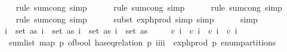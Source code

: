 \begin{isabellebody}
\ \ \ \ \isamarkupfalse%
\ {\isacharparenleft}{\kern0pt}rule\ sum{\isachardot}{\kern0pt}cong{\isacharcomma}{\kern0pt}\ simp{\isacharparenright}{\kern0pt}\isanewline
\ \ \ \ \isamarkupfalse%
\ {\isacharparenleft}{\kern0pt}rule\ sum{\isachardot}{\kern0pt}cong{\isacharcomma}{\kern0pt}\ simp{\isacharparenright}{\kern0pt}\isanewline
\ \ \ \ \isamarkupfalse%
\ {\isacharparenleft}{\kern0pt}rule\ sum{\isachardot}{\kern0pt}cong{\isacharcomma}{\kern0pt}\ simp{\isacharparenright}{\kern0pt}\isanewline
\ \ \ \ \isamarkupfalse%
\ {\isacharparenleft}{\kern0pt}rule\ sum{\isachardot}{\kern0pt}cong{\isacharcomma}{\kern0pt}\ simp{\isacharparenright}{\kern0pt}\isanewline
\ \ \ \ \isamarkupfalse%
\ {\isacharparenleft}{\kern0pt}subst\ exp{\isacharunderscore}{\kern0pt}h{\isacharunderscore}{\kern0pt}prod{\isacharcomma}{\kern0pt}\ simp{\isacharcomma}{\kern0pt}\ simp{\isacharparenright}{\kern0pt}\isanewline
\ \ \ \ \isamarkupfalse%
\ simp\isanewline
\ \ \isamarkupfalse%
\ \isamarkupfalse%
\ {\isachardoublequoteopen}{\isachardot}{\kern0pt}{\isachardot}{\kern0pt}{\isachardot}{\kern0pt}\ {\isacharequal}{\kern0pt}\ {\isacharparenleft}{\kern0pt}{\isasymSum}i{}\ {\isasymin}\ set\ as{\isachardot}{\kern0pt}\ {\isacharparenleft}{\kern0pt}{\isasymSum}i{}\ {\isasymin}\ set\ as{\isachardot}{\kern0pt}\ {\isacharparenleft}{\kern0pt}{\isasymSum}i{}\ {\isasymin}\ set\ as{\isachardot}{\kern0pt}\ {\isacharparenleft}{\kern0pt}{\isasymSum}i{}\ {\isasymin}\ set\ as{\isachardot}{\kern0pt}\ \isanewline
\ \ \ \ c\ i{}\ {\isacharasterisk}{\kern0pt}\ c\ i{}\ {\isacharasterisk}{\kern0pt}\ c\ i{}\ {\isacharasterisk}{\kern0pt}\ c\ i{}\ {\isacharasterisk}{\kern0pt}\ \isanewline
\ \ \ \ {\isacharparenleft}{\kern0pt}sum{\isacharunderscore}{\kern0pt}list\ {\isacharparenleft}{\kern0pt}map\ {\isacharparenleft}{\kern0pt}{\isasymlambda}p{\isachardot}{\kern0pt}\ of{\isacharunderscore}{\kern0pt}bool\ {\isacharparenleft}{\kern0pt}has{\isacharunderscore}{\kern0pt}eq{\isacharunderscore}{\kern0pt}relation\ p\ {\isacharbrackleft}{\kern0pt}i{}{\isacharcomma}{\kern0pt}i{}{\isacharcomma}{\kern0pt}i{}{\isacharcomma}{\kern0pt}i{}{\isacharbrackright}{\kern0pt}{\isacharparenright}{\kern0pt}\ {\isacharasterisk}{\kern0pt}\ exp{\isacharunderscore}{\kern0pt}h{\isacharunderscore}{\kern0pt}prod\ p{\isacharparenright}{\kern0pt}\ {\isacharparenleft}{\kern0pt}enum{\isacharunderscore}{\kern0pt}partitions\ {}{\isacharparenright}{\kern0pt}{\isacharparenright}{\kern0pt}{\isacharparenright}{\kern0pt}{\isacharparenright}{\kern0pt}{\isacharparenright}{\kern0pt}{\isacharparenright}{\kern0pt}{\isacharparenright}{\kern0pt}{\isachardoublequoteclose}\isanewline

\end{isabellebody}
